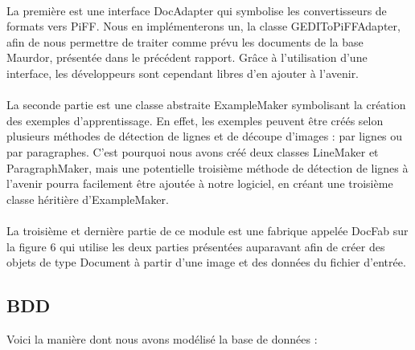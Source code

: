 \paragraph{}

La première est  une interface DocAdapter qui symbolise les convertisseurs de formats vers PiFF. Nous en implémenterons un, la classe GEDIToPiFFAdapter, afin de nous permettre de traiter comme prévu les documents de la base Maurdor, présentée dans le précédent rapport. Grâce à l’utilisation d’une interface, les développeurs sont cependant libres d’en ajouter à l’avenir.

\paragraph{}

La seconde partie est une classe abstraite ExampleMaker symbolisant la création des exemples d’apprentissage. En effet, les exemples peuvent être créés selon plusieurs méthodes de détection de lignes et de découpe d’images : par lignes ou par paragraphes. C’est pourquoi nous avons créé deux classes LineMaker et ParagraphMaker, mais une potentielle troisième méthode de détection de lignes à l’avenir pourra facilement être ajoutée à notre logiciel, en créant une troisième classe héritière d’ExampleMaker.

\paragraph{}

La troisième et dernière partie de ce module est une fabrique appelée DocFab sur la figure 6 qui utilise les deux parties présentées auparavant afin de créer des objets de type Document à partir d’une image et des données du fichier d’entrée.

\subsection{BDD}

Voici la manière dont nous avons modélisé la base de données :

\paragraph{}

